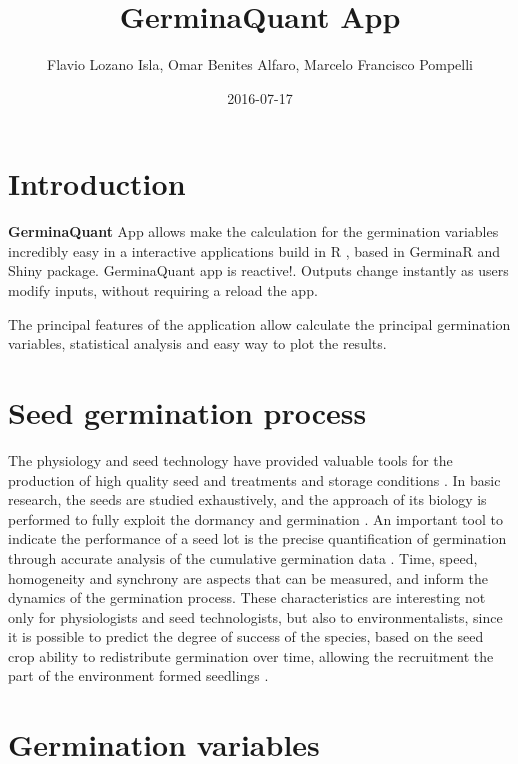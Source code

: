 \documentclass[]{book}
\title{GerminaQuant App}
\author{Flavio Lozano Isla, Omar Benites Alfaro, Marcelo Francisco Pompelli}
\date{2016-07-17}
\begin{document}
\maketitle

{
\setcounter{tocdepth}{1}
\tableofcontents
}
\chapter*{Introduction}\label{introduction}

\textbf{GerminaQuant} App allows make the calculation for the
germination variables incredibly easy in a interactive applications
build in R \citep{R-base}, based in GerminaR and Shiny \citep{R-shiny}
package. GerminaQuant app is reactive!. Outputs change instantly as
users modify inputs, without requiring a reload the app.

The principal features of the application allow calculate the principal
germination variables, statistical analysis and easy way to plot the
results.

\chapter{Seed germination process}\label{seed-germination-process}

The physiology and seed technology have provided valuable tools for the
production of high quality seed and treatments and storage conditions
\citep{Marcos-Filho1998}. In basic research, the seeds are studied
exhaustively, and the approach of its biology is performed to fully
exploit the dormancy and germination \citep{Penfield2009}. An important
tool to indicate the performance of a seed lot is the precise
quantification of germination through accurate analysis of the
cumulative germination data \citep{Joosen2010}. Time, speed, homogeneity
and synchrony are aspects that can be measured, and inform the dynamics
of the germination process. These characteristics are interesting not
only for physiologists and seed technologists, but also to
environmentalists, since it is possible to predict the degree of success
of the species, based on the seed crop ability to redistribute
germination over time, allowing the recruitment the part of the
environment formed seedlings \citep{Ranal2006}.

\chapter{Germination variables}\label{germination-variables}
\end{document}
